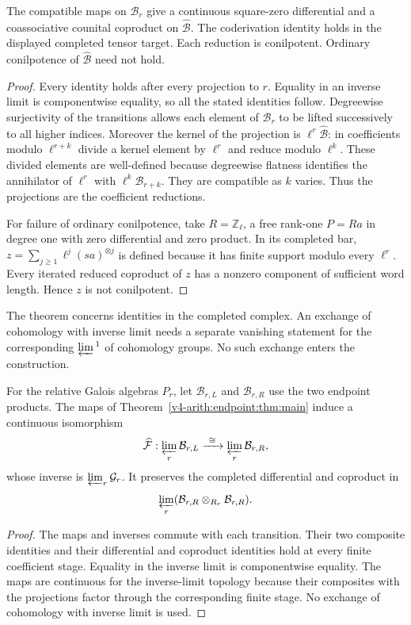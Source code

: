 \begin{theorem}\label{v4-arith:relative-bar:thm:completion}
The compatible maps on $\mathcal{B}_r$ give a continuous square-zero
differential and a coassociative counital coproduct on
$\widehat{\mathcal{B}}$. The coderivation identity holds in the displayed
completed tensor target. Each reduction is conilpotent. Ordinary
conilpotence of $\widehat{\mathcal{B}}$ need not hold.
\end{theorem}
\begin{proof}
Every identity holds after every projection to $r$. Equality in an
inverse limit is componentwise equality, so all the stated identities
follow. Degreewise surjectivity of the transitions allows each element
of $\mathcal{B}_r$ to be lifted successively to all higher indices.
Moreover the kernel of the projection is $\ell^r\widehat{\mathcal{B}}$:
in coefficients modulo $\ell^{r+k}$ divide a kernel element by
$\ell^r$ and reduce modulo $\ell^k$. These divided elements are
well-defined because degreewise flatness identifies the annihilator
of $\ell^r$ with $\ell^k\mathcal{B}_{r+k}$. They are compatible as $k$
varies. Thus the projections are the coefficient
reductions.

For failure of ordinary conilpotence, take $R=\mathbb{Z}_\ell$, a free
rank-one $P=Ra$ in degree one with zero differential and zero product.
In its completed bar, $z=\sum_{j\ge1}\ell^j(sa)^{\otimes j}$
is defined because it has finite support modulo every $\ell^r$.
Every iterated reduced coproduct of $z$ has a nonzero component of
sufficient word length. Hence $z$ is not conilpotent.
\end{proof}

The theorem concerns identities in the completed complex. An exchange
of cohomology with inverse limit needs a separate vanishing statement
for the corresponding $\varprojlim{}^1$ of cohomology groups. No such
exchange enters the construction.

\begin{corollary}\label{v4-arith:endpoint:cor:adic}
For the relative Galois algebras $P_r$, let $\mathcal{B}_{r,L}$ and $\mathcal{B}_{r,R}$ use the two endpoint products. The maps of Theorem~\ref{v4-arith:endpoint:thm:main} induce a continuous isomorphism
\[
 \widehat{\mathcal{F}}:\varprojlim_r\mathcal{B}_{r,L}
   \xrightarrow{\ \cong\ }\varprojlim_r\mathcal{B}_{r,R},
\]
whose inverse is $\varprojlim_r\mathcal{G}_r$. It preserves the completed differential and coproduct in
\[
 \varprojlim_r(\mathcal{B}_{r,R}\otimes_{R_r}\mathcal{B}_{r,R}).
\]
\end{corollary}
\begin{proof}
The maps and inverses commute with each transition. Their two composite identities and their differential and coproduct identities hold at every finite coefficient stage. Equality in the inverse limit is componentwise equality. The maps are continuous for the inverse-limit topology because their composites with the projections factor through the corresponding finite stage. No exchange of cohomology with inverse limit is used.
\end{proof}


